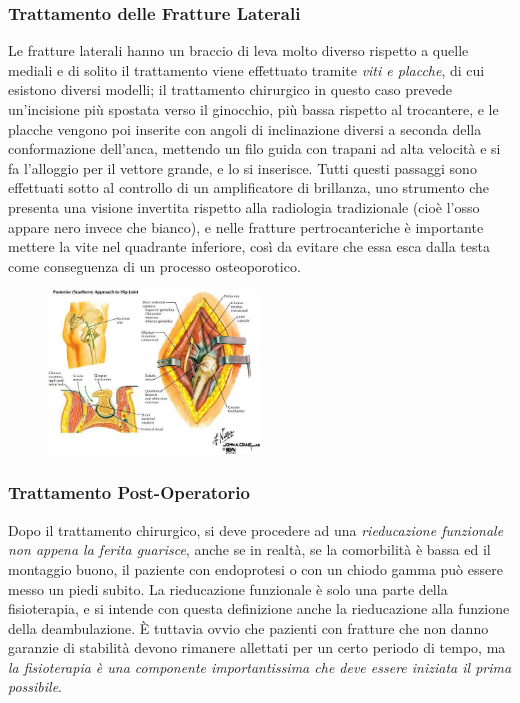 \subsubsection{Trattamento delle Fratture Laterali}


Le fratture laterali hanno un braccio di leva molto diverso rispetto a
quelle mediali e di solito il trattamento viene effettuato tramite
\emph{viti e placche}, di cui esistono diversi modelli; il trattamento
chirurgico in questo caso prevede un'incisione più spostata verso il
ginocchio, più bassa rispetto al trocantere, e le placche vengono poi
inserite con angoli di inclinazione diversi a seconda della
conformazione dell'anca, mettendo un filo guida con trapani ad alta
velocità e si fa l'alloggio per il vettore grande, e lo si inserisce.
Tutti questi passaggi sono effettuati sotto al controllo di un
amplificatore di brillanza, uno strumento che presenta una visione
invertita rispetto alla radiologia tradizionale (cioè l'osso appare nero
invece che bianco), e nelle fratture pertrocanteriche è importante
mettere la vite nel quadrante inferiore, così da evitare che essa esca
dalla testa come conseguenza di un processo osteoporotico.
\begin{figure}[!ht]
\centering
	\includegraphics[width=0.5\textwidth]{007/image16.jpeg}
\end{figure}
\subsubsection{Trattamento Post-Operatorio}

Dopo il trattamento chirurgico, si deve procedere ad una
\emph{rieducazione funzionale non appena la ferita guarisce}, anche se
in realtà, se la comorbilità è bassa ed il montaggio buono, il paziente
con endoprotesi o con un chiodo gamma può essere messo un piedi subito.
La rieducazione funzionale è solo una parte della fisioterapia, e si
intende con questa definizione anche la rieducazione alla funzione della
deambulazione. È tuttavia ovvio che pazienti con fratture che non danno
garanzie di stabilità devono rimanere allettati per un certo periodo di
tempo, ma \emph{la fisioterapia è una componente importantissima che
deve essere iniziata il prima possibile}.

